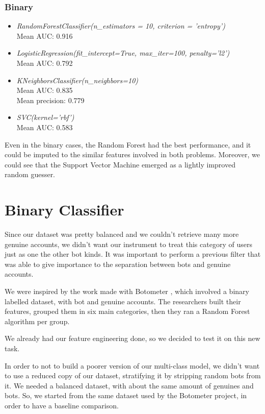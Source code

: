 \subsubsection{Binary}
\begin{itemize}
	\item[\PencilRight] \textit{RandomForestClassifier(n\_estimators = 10, criterion = 'entropy')}\\
	Mean AUC: 0.916\\
	\item[\PencilRight]\textit{LogisticRegression(fit\_intercept=True, max\_iter=100, penalty='l2')}\\
	Mean AUC: 0.792\\
	\item[\PencilRight]\textit{KNeighborsClassifier(n\_neighbors=10)}\\
	Mean AUC: 0.835\\
	Mean precision: 0.779\\
	\item[\PencilRight]\textit{SVC(kernel='rbf')}\\
	Mean AUC: 0.583\\
\end{itemize}
Even in the binary cases, the Random Forest had the best performance, and it could be imputed to the similar features involved in both problems. Moreover, we could see that the Support Vector Machine emerged as a lightly improved random guesser.


\section{Binary Classifier}
Since our dataset was pretty balanced and we couldn't retrieve many more genuine accounts, we didn't want our instrument to treat this category of users just as one the other bot kinds. It was important to perform a previous filter that was able to give importance to the separation between bots and genuine accounts.

We were inspired by the work made with Botometer \cite{Botometer}, which involved a binary labelled dataset, with bot and genuine accounts.
The researchers built their features, grouped them in six main categories, then they ran a Random Forest algorithm per group.

We already had our feature engineering done, so we decided to test it on this new task.

In order to not to build a poorer version of our multi-class model, we didn't want to use a reduced copy of our dataset, stratifying it by stripping random bots from it. We needed a balanced dataset, with about the same amount of genuines and bots. So, we started from the same dataset used by the Botometer project, in order to have a baseline comparison.
